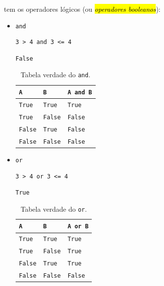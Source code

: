 {\python} tem os operadores lógicos (ou \hl{\emph{operadores booleanos}}):
\begin{itemize}
\item \lstinline+and+ 

\begin{lstlisting}[xrightmargin=2.5em]
3 > 4 and 3 <= 4
\end{lstlisting}

\begin{verbatim}
False
\end{verbatim}

  \begin{table}[H]
    \centering
    \caption{Tabela verdade do \lstinline+and+.}
    \begin{tabular}{ll|l}
      {\texttt{A}} & {\texttt{B}} & {\lstinline+A and B+}\\\hline
      {\texttt{True}} & {\texttt{True}} & {\texttt{True}}\\
      {\texttt{True}} & {\texttt{False}} & {\texttt{False}}\\
      {\texttt{False}} & {\texttt{True}} & {\texttt{False}}\\
      {\texttt{False}} & {\texttt{False}} & {\texttt{False}}\\\hline
    \end{tabular}
  \end{table}

\ifisbook
\newpage
\fi

\item \lstinline+or+ 

\begin{lstlisting}[xrightmargin=2.5em]
3 > 4 or 3 <= 4
\end{lstlisting}

\begin{verbatim}
True
\end{verbatim}

  \begin{table}[H]
    \centering
    \caption{Tabela verdade do \lstinline+or+.}
    \begin{tabular}{ll|l}
      {\texttt{A}}     & {\texttt{B}}     & {\lstinline+A or B+} \\\hline
      {\texttt{True}}  & {\texttt{True}}  & {\texttt{True}} \\
      {\texttt{True}}  & {\texttt{False}} & {\texttt{True}} \\
      {\texttt{False}} & {\texttt{True} } & {\texttt{True}} \\
      {\texttt{False}} & {\texttt{False}} & {\texttt{False}} \\\hline
    \end{tabular}
  \end{table}


\end{itemize}
